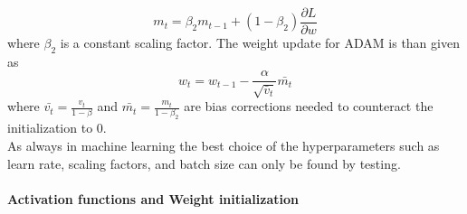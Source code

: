 \begin{equation}
m_t = \beta_2 m_{t-1} + (1-\beta_2) \frac{\partial L}{\partial w}
\end{equation}
where $\beta_2$ is a constant scaling factor. The weight update for ADAM is than given as
\begin{equation}
w_t = w_{t-1}-\frac{\alpha}{\sqrt{\bar{v}_t}} \bar{m_t}
\end{equation}
where $\bar{v_t} = \frac{v_t}{1 - \beta}$ and $\bar{m_t} = \frac{m_t}{1 - \beta_2}$ are bias corrections needed to counteract the initialization to 0. \\
As always in machine learning the best choice of the hyperparameters such as learn rate, scaling factors, and batch size can only be found by testing.

\newpage

\paragraph{Activation functions and Weight initialization}  \mbox{} \\

